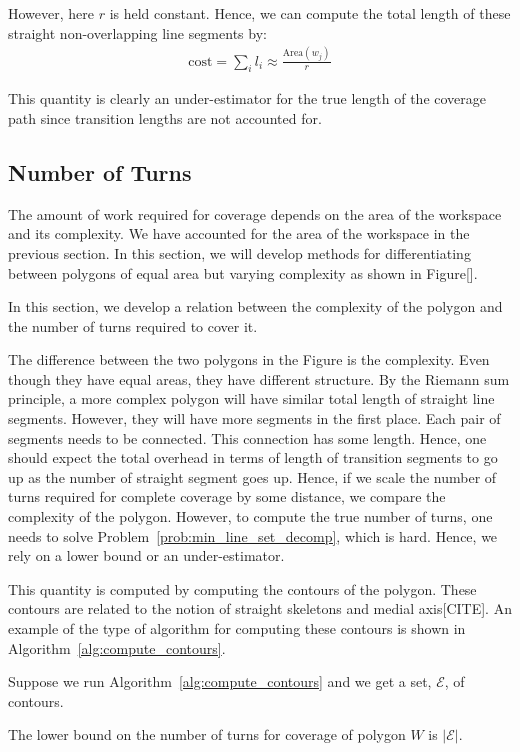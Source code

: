 \documentclass[../main.tex]{subfiles}
\begin{document}
However, here $r$ is held constant. Hence, we can compute the total length of these straight non-overlapping line segments by:
\begin{equation}
\begin{aligned}
		\text{cost}=\sum_{i}l_i\approx\frac{\text{Area}(w_j)}{r}
\end{aligned}
\end{equation}

This quantity is clearly an under-estimator for the true length of the coverage path since transition lengths are not accounted for.


\subsection{Number of Turns}
The amount of work required for coverage depends on the area of the workspace and its complexity. We have accounted for the area of the workspace in the previous section. In this section, we will develop methods for differentiating between polygons of equal area but varying complexity as shown in Figure[].

In this section, we develop a relation between the complexity of the polygon and the number of turns required to cover it.

The difference between the two polygons in the Figure is the complexity. Even though they have equal areas, they have different structure. By the Riemann sum principle, a more complex polygon will have similar total length of straight line segments. However, they will have more segments in the first place. Each pair of segments needs to be connected. This connection has some length. Hence, one should expect the total overhead in terms of length of transition segments to go up as the number of straight segment goes up. Hence, if we scale the number of turns required for complete coverage by some distance, we compare the complexity of the polygon. However, to compute the true number of turns, one needs to solve Problem~\ref{prob:min_line_set_decomp}, which is hard. Hence, we rely on a lower bound or an under-estimator.

This quantity is computed by computing the contours of the polygon. These contours are related to the notion of straight skeletons and medial axis[CITE]. An example of the type of algorithm for computing these contours is shown in Algorithm~\ref{alg:compute_contours}.

Suppose we run Algorithm~\ref{alg:compute_contours} and we get a set, $\mathcal{E}$, of contours.
\begin{property}
The lower bound on the number of turns for coverage of polygon $W$ is $|\mathcal{E}|$.
\end{property}
\end{document}
